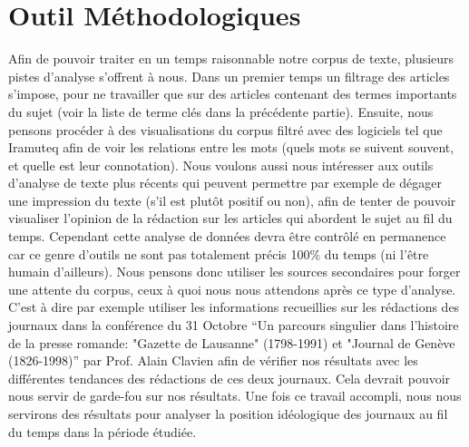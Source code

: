 \documentclass[ebook,9pt,oneside,openany]{memoir}
\begin{document}
\section*{Outil Méthodologiques}
Afin de pouvoir traiter en un temps raisonnable notre corpus de texte, plusieurs pistes d’analyse s’offrent à nous. Dans un premier temps un filtrage des articles s’impose, pour ne travailler que sur des articles contenant des termes importants du sujet (voir la liste de terme clés dans la précédente partie).
    Ensuite, nous pensons procéder à des visualisations du corpus filtré avec des logiciels tel que Iramuteq afin de voir les relations entre les mots (quels mots se suivent souvent, et quelle est leur connotation). Nous voulons aussi nous intéresser aux outils d’analyse de texte plus récents qui peuvent permettre par exemple de dégager une impression du texte (s’il est plutôt positif ou non), afin de tenter de pouvoir visualiser l’opinion de la rédaction sur les articles qui abordent le sujet au fil du temps.
    Cependant cette analyse de données devra être contrôlé en permanence car ce genre d’outils ne sont pas totalement précis 100\% du temps (ni l’être humain d’ailleurs).
    Nous pensons donc utiliser les sources secondaires pour forger une attente du corpus, ceux à quoi nous nous attendons après ce type d’analyse. C’est à dire par exemple utiliser les informations recueillies sur les rédactions des journaux dans la conférence du 31 Octobre “Un parcours singulier dans l'histoire de la presse romande: "Gazette de Lausanne" (1798-1991) et "Journal de Genève (1826-1998)” par Prof. Alain Clavien afin de vérifier nos résultats avec les différentes tendances des rédactions de ces deux journaux. Cela devrait pouvoir nous servir de garde-fou sur nos résultats. Une fois ce travail accompli, nous nous servirons des résultats pour analyser la position idéologique des journaux au fil du temps dans la période étudiée.
\end{document}
